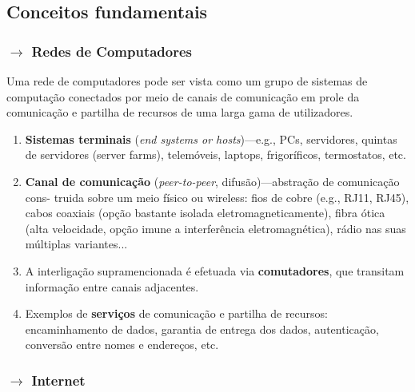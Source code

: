 \subsection[1.1 Conceitos fundamentais]{\hspace*{0.075 em}\raisebox{0.2 em}{$\pmb{\drsh}$}  Conceitos fundamentais}
\label{subsec:conceitos-fundamentais}

\subsubsection[1.1.1 Redes de Computadores]{$\pmb{\rightarrow}$ Redes de Computadores}

Uma rede de computadores pode ser vista como um grupo de sistemas de computação conectados por meio de canais de comunicação em prole da comunicação e partilha de recursos de uma larga gama de utilizadores.

\vspace{-0.5em}
\begin{enumerate}
    \item \textbf{Sistemas terminais} (\textit{end systems or hosts})---e.g., PCs, servidores, quintas de servidores (server farms), telemóveis, laptops, frigoríficos, termostatos, etc.
    \item \textbf{Canal de comunicação} (\textit{peer-to-peer}, difusão)---abstração de comunicação cons- truida sobre um meio físico ou wireless: fios de cobre (e.g., RJ11, RJ45), cabos coaxiais (opção bastante isolada eletromagneticamente), fibra ótica (alta velocidade, opção imune a interferência eletromagnética), rádio nas suas múltiplas variantes...
    \item A interligação supramencionada é efetuada via \textbf{comutadores}, que transitam informação entre canais adjacentes.
    \item Exemplos de \textbf{serviços} de comunicação e partilha de recursos: encaminhamento de dados, garantia de entrega dos dados, autenticação, conversão entre nomes e endereços, etc.
\end{enumerate}

\vspace{-2em}
\subsubsection[1.1.2 Internet]{$\pmb{\rightarrow}$ Internet}

